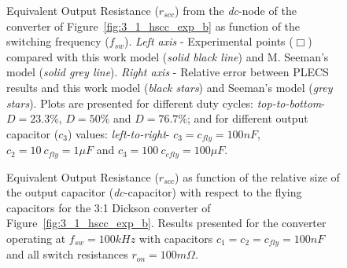 \begin{figure}[!h]
\newcommand\pHeigh{3.25cm}
\newcommand\pWidth{2.5cm}
\centering
    \begin{subfigure}{\textwidth}
       \parbox[b]{.325\linewidth}{
            \raggedright
            
        }
       \parbox[b]{.325\linewidth}{
            \raggedleft
            
        }
       \parbox[b]{.325\linewidth}{
            \centering
            
        }
    \end{subfigure}

    \begin{subfigure}{\textwidth}
       \parbox[b]{.325\linewidth}{
            \raggedright
            
        }
       \parbox[b]{.325\linewidth}{
            \raggedleft
            
        }
       \parbox[b]{.325\linewidth}{
            \centering
            
        }
    \end{subfigure}

    \begin{subfigure}{\textwidth}
       \parbox[b]{.325\linewidth}{
            \raggedright
            
        }
       \parbox[b]{.325\linewidth}{
            \raggedleft
            
        }
       \parbox[b]{.325\linewidth}{
            \centering
            
        }
    \end{subfigure}

\caption{Equivalent Output Resistance ($r_{scc}$) from the \emph{dc}-node of the converter of Figure~\ref{fig:3_1_hscc_exp_b} as function of the switching frequency ($f_{sw}$). \emph{Left axis} - Experimental points ($\Box$) compared with this work model (\emph{solid black line}) and M. Seeman's model (\emph{solid grey line}). \emph{Right axis} - Relative error between PLECS results and this work model (\emph{black stars}) and Seeman's model (\emph{grey stars}). Plots are presented for different duty cycles: \emph{top-to-bottom}- $D = 23.3\%$, $D = 50\%$ and $D = 76.7\%$; and for different output capacitor ($c_3$) values: \emph{left-to-right}- $c_3 = c_{fly} = 100nF$, $c_2 = 10~c_{fly} = 1\mu F$ and $c_3 = 100~c_{cfly} = 100\mu F$.}
\label{fig:exp_rscc_dc_node}
\end{figure}

\begin{figure}[!h]
\newcommand\pHeigh{5cm}
\newcommand\pWidth{7cm}
\centering
     
     \caption{Equivalent Output Resistance ($r_{scc}$) as function of the relative size of the output capacitor (\emph{dc}-capacitor) with respect to the flying capacitors for the 3:1 Dickson converter of Figure~\ref{fig:3_1_hscc_exp_b}. Results presented for the converter operating at $f_{sw}=100kHz$ with capacitors $c_1=c_2=c_{fly}=100nF$ and all switch resistances $r_{on} = 100m\Omega$.}\label{fig:exp_rscc_pwm_node_fsw}
\end{figure}
